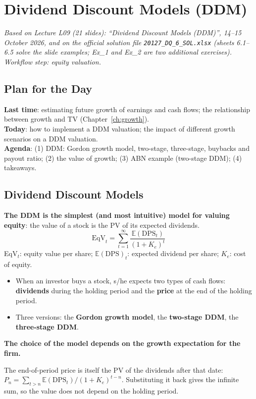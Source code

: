 \chapter{Dividend Discount Models (DDM)}\label{ch:ddm}

\emph{Based on Lecture L09 (21 slides): ``Dividend Discount Models (DDM)'', 14--15 October 2026, and on the official solution file \texttt{20127\_DQ\_6\_SOL.xlsx} (sheets 6.1--6.5 solve the slide examples; Ex\_1 and Ex\_2 are two additional exercises). Workflow step: equity valuation.}

\section{Plan for the Day}
\textbf{Last time}: estimating future growth of earnings and cash flows; the relationship between growth and TV (Chapter~\ref{ch:growth}).\\
\textbf{Today}: how to implement a DDM valuation; the impact of different growth scenarios on a DDM valuation.\\
\textbf{Agenda}: (1) DDM: Gordon growth model, two-stage, three-stage, buybacks and payout ratio; (2) the value of growth; (3) ABN example (two-stage DDM); (4) takeaways.

\section{Dividend Discount Models}

\begin{keybox}
\textbf{The DDM is the simplest (and most intuitive) model for valuing equity}: the value of a stock is the PV of its expected dividends.
\[
\text{EqV}_t=\sum_{t=1}^{\infty}\frac{\mathbb{E}(\text{DPS}_t)}{(1+K_e)^t}
\]
EqV$_t$: equity value per share; $\mathbb{E}(\text{DPS})_t$: expected dividend per share; $K_e$: cost of equity.
\end{keybox}
\begin{itemize}
  \item When an investor buys a stock, s/he expects two types of cash flows: \textbf{dividends} during the holding period and the \textbf{price} at the end of the holding period.
  \item Three versions: the \textbf{Gordon growth model}, the \textbf{two-stage DDM}, the \textbf{three-stage DDM}.
\end{itemize}
\begin{keybox}
\textbf{The choice of the model depends on the growth expectation for the firm.}
\end{keybox}
\begin{addbox}
The end-of-period price is itself the PV of the dividends after that date: $P_n=\sum_{t>n}\mathbb{E}(\text{DPS}_t)/(1+K_e)^{t-n}$. Substituting it back gives the infinite sum, so the value does not depend on the holding period.
\end{addbox}

